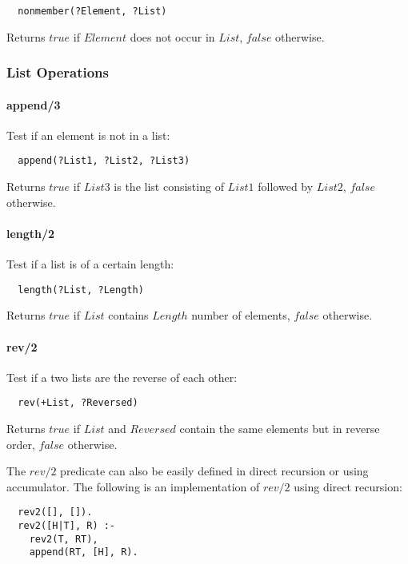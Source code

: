 \documentclass{article}
\begin{document}
\begin{multicols}{2}
  \begin{lstlisting}
  nonmember(?Element, ?List)
  \end{lstlisting} 
  
 Returns $true$ if $Element$ does not occur in $List$, $false$ otherwise.
  
  \subsubsection{List Operations}

  \paragraph{append/3} Test if an element is not in a list:  
  
  \begin{lstlisting}
  append(?List1, ?List2, ?List3)
  \end{lstlisting} 
  
  Returns $true$ if $List3$ is the list consisting of $List1$ followed by $List2$, $false$ otherwise.
  
  \paragraph{length/2} Test if a list is of a certain length:
  
  \begin{lstlisting}
  length(?List, ?Length)
  \end{lstlisting} 
  
  Returns $true$ if $List$ contains $Length$ number of elements, $false$ otherwise.
  
  \paragraph{rev/2} Test if a two lists are the reverse of each other:
  
  \begin{lstlisting}
  rev(+List, ?Reversed)
  \end{lstlisting} 
  
  Returns $true$ if $List$ and $Reversed$ contain the same elements but in reverse order, $false$ otherwise.
  
  The $rev/2$ predicate can also be easily defined in direct recursion or using accumulator. The following is an implementation of $rev/2$ using direct recursion:
  
  \begin{lstlisting}
  rev2([], []).
  rev2([H|T], R) :-
    rev2(T, RT),
    append(RT, [H], R).
  \end{lstlisting}
  

\end{multicols}
\end{document}
